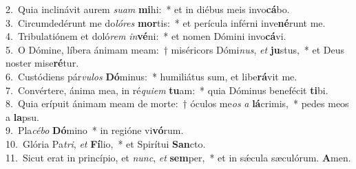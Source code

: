 {2.~}Quia inclinávit aurem \textit{su}\textit{am} \textbf{mi}hi:~* et in diébus meis invo\textbf{cá}bo.\\
{3.~}Circumdedérunt me do\textit{ló}\textit{res} \textbf{mor}tis:~* et perícula inférni inve\textbf{né}runt me.\\
{4.~}Tribulatiónem et doló\textit{rem} \textit{in}\textbf{vé}ni:~* et nomen Dómini invo\textbf{cá}vi.\\
{5.~}O Dómine, líbera ánimam meam:~† miséricors Dómi\textit{nus}, \textit{et} \textbf{ju}stus,~* et Deus noster mise\textbf{ré}tur.\\
{6.~}Custódiens pár\textit{vu}\textit{los} \textbf{Dó}minus:~* humiliátus sum, et libe\textbf{rá}vit me.\\
{7.~}Convértere, ánima mea, in ré\textit{qui}\textit{em} \textbf{tu}am:~* quia Dóminus benefécit \textbf{ti}bi.\\
{8.~}Quia erípuit ánimam meam de morte:~† óculos me\textit{os} \textit{a} \textbf{lá}crimis,~* pedes meos a \textbf{la}psu.\\
{9.~}Pla\textit{cé}\textit{bo} \textbf{Dó}mino~* in regióne vi\textbf{vó}rum.\\
{10.~}Glória Pa\textit{tri}, \textit{et} \textbf{Fí}lio,~* et Spirítui \textbf{San}cto.\\
{11.~}Sicut erat in princípio, et \textit{nunc}, \textit{et} \textbf{sem}per,~* et in sǽcula sæculórum. \textbf{A}men.\\

